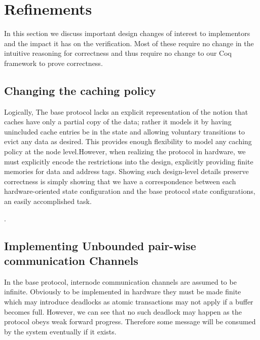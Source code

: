 \section{Refinements}
\label{sec:Refinements}

In this section we discuss important design changes of interest to
implementors and the impact it has on the verification. Most of these
require no change in the intuitive reasoning for correctness and thus
require no change to our Coq framework to prove correctness.



\subsection{Changing the caching policy}

Logically, The base protocol lacks an explicit representation of the
notion that caches have only a partial copy of the data; rather it
models it by having unincluded cache entries be in the \In state and
allowing voluntary transitions to evict any data as desired. This
provides enough flexibility to model any caching policy at the node
level.However, when realizing the protocol in hardware, we must
explicitly encode the restrictions into the design, \eg{} explicitly
providing finite memories for data and address tags. Showing such
design-level details preserve correctness is simply showing that we
have a correspondence between each hardware-oriented state
configuration and the base protocol state configurations, an easily
accomplished task.

.

\subsection{Implementing Unbounded pair-wise communication Channels}

In the base protocol, internode communication channels are assumed to
be infinite. Obviously to be implemented in hardware they must be made
finite which may introduce deadlocks as atomic transactions may not
apply if a buffer becomes full. However, we can see that no such
deadlock may happen as the protocol obeys weak forward
progress. Therefore some message will be consumed by the system
eventually if it exists.

